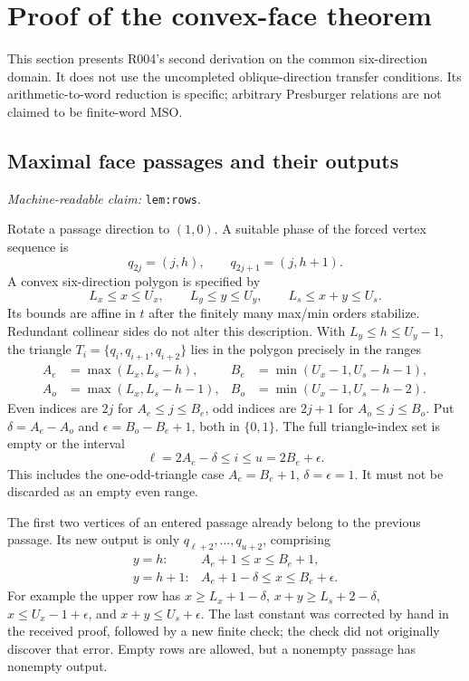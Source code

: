 \documentclass[11pt]{amsart}
\newcommand{\record}[1]{\nolinkurl{#1}}
\newcommand{\claimid}[1]{\par\nopagebreak\noindent\textit{Machine-readable claim:} \record{#1}.\par}
\theoremstyle{definition}\newtheorem{definition}{Definition}
\begin{document}
\section{Proof of the convex-face theorem}\label{sec:proof}
This section presents R004's second derivation on the common
six-direction domain. It does not use the uncompleted oblique-direction
transfer conditions. Its arithmetic-to-word reduction is specific;
arbitrary Presburger relations are not claimed to be finite-word MSO.

\subsection{Maximal face passages and their outputs}\label{lem:rows}
\claimid{lem:rows}
Rotate a passage direction to $(1,0)$. A suitable phase of the forced
vertex sequence is
\begin{equation}\label{eq:rows}
 q_{2j}=(j,h),\qquad q_{2j+1}=(j,h+1).
\end{equation}
A convex six-direction polygon is specified by
\[
 L_x\le x\le U_x,\qquad L_y\le y\le U_y,\qquad
 L_s\le x+y\le U_s.
\]
Its bounds are affine in $t$ after the finitely many max/min orders
stabilize. Redundant collinear sides do not alter this description.
With $L_y\le h\le U_y-1$, the triangle
$T_i=\{q_i,q_{i+1},q_{i+2}\}$ lies in the polygon precisely in the ranges
\begin{equation}\label{eq:triangle-bounds}
\begin{aligned}
 A_e&=\max(L_x,L_s-h),& B_e&=\min(U_x-1,U_s-h-1),\\
 A_o&=\max(L_x,L_s-h-1),& B_o&=\min(U_x-1,U_s-h-2).
\end{aligned}
\end{equation}
Even indices are $2j$ for $A_e\le j\le B_e$, odd indices are $2j+1$
for $A_o\le j\le B_o$. Put $\delta=A_e-A_o$ and
$\epsilon=B_o-B_e+1$, both in $\{0,1\}$. The full triangle-index set
is empty or the interval
\begin{equation}\label{eq:passage}
 \ell=2A_e-\delta\le i\le u=2B_e+\epsilon.
\end{equation}
This includes the one-odd-triangle case $A_e=B_e+1$,
$\delta=\epsilon=1$. It must not be discarded as an empty even range.

The first two vertices of an entered passage already belong to the
previous passage. Its new output is only
$q_{\ell+2},\ldots,q_{u+2}$, comprising
\begin{equation}\label{eq:output}
\begin{array}{ll}
 y=h:   &A_e+1\le x\le B_e+1,\\
 y=h+1: &A_e+1-\delta\le x\le B_e+\epsilon.
\end{array}
\end{equation}
For example the upper row has
$x\ge L_x+1-\delta$, $x+y\ge L_s+2-\delta$,
$x\le U_x-1+\epsilon$, and $x+y\le U_s+\epsilon$.
The last constant was corrected by hand in the received proof, followed
by a new finite check; the check did not originally discover that error.
Empty rows are allowed, but a nonempty passage has nonempty output.
\end{document}
